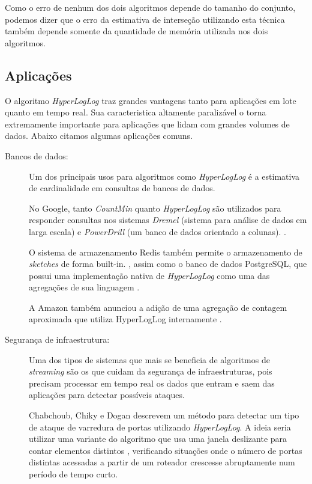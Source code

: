 Como o erro de nenhum dos dois algoritmos depende do tamanho do conjunto, podemos dizer que o erro da estimativa de interseção utilizando esta técnica também depende somente da quantidade de memória utilizada nos dois algoritmos.

\subsection{Aplicações}

O algoritmo \emph{HyperLogLog} traz grandes vantagens tanto para aplicações em lote quanto em tempo real. Sua caracteristica altamente paralizável o torna extremamente importante para aplicações que lidam com grandes volumes de dados. Abaixo citamos algumas aplicações comuns.

\begin{description}

\item[Bancos de dados:]

Um dos principais usos para algoritmos como \emph{HyperLogLog} é a estimativa de cardinalidade em consultas de bancos de dados.

No Google, tanto \emph{CountMin} quanto \emph{HyperLogLog} são utilizados para responder consultas nos sistemas \emph{Dremel} (sistema para análise de dados em larga escala) e \emph{PowerDrill} (um banco de dados orientado a colunas). \cite{hall2012processing,melnik2010dremel,heule2013hyperloglog}.

O sistema de armazenamento Redis também permite o armazenamento de \emph{sketches} de forma built-in. \cite{sindhu2015brief}, assim como o banco de dados PostgreSQL, que possui uma implementação nativa de \emph{HyperLogLog} como uma das agregações de sua linguagem \cite{chabchoub2014can}.

A Amazon também anunciou a adição de uma agregação de contagem aproximada que utiliza HyperLogLog internamente \cite{amazon2015hyperloglog}.

\item[Segurança de infraestrutura:]

Uma dos tipos de sistemas que mais se beneficia de algoritmos de \emph{streaming} são os que cuidam da segurança de infraestruturas, pois precisam processar em tempo real os dados que entram e saem das aplicações para detectar possíveis ataques.

Chabchoub, Chiky e Dogan \cite{chabchoub2014can} descrevem um método para detectar um tipo de ataque de varredura de portas utilizando \emph{HyperLogLog}. A ideia seria utilizar uma variante do algoritmo que usa uma janela deslizante para contar elementos distintos \cite{chabchoub2010sliding}, verificando situações onde o número de portas distintas acessadas a partir de um roteador crescesse abruptamente num período de tempo curto.


\end{description}
